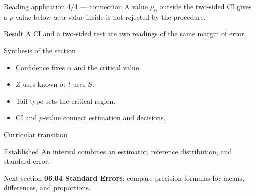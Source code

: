 \documentclass[10pt,aspectratio=169]{beamer}
\begin{document}
\begin{frame}{Reading application 4/4 --- connection}
  \footnotesize
  A value $\mu_0$ outside the two-sided CI gives a $p$-value below $\alpha$;
  a value inside is not rejected by the procedure.
  \begin{exampleblock}{Result}
    A CI and a two-sided test are two readings of the same margin of error.
  \end{exampleblock}
\end{frame}

\begin{frame}{Synthesis of the section}
  \footnotesize
  \begin{itemize}\itemsep=0.12cm
    \item Confidence fixes $\alpha$ and the critical value.
    \item $Z$ uses known $\sigma$; $t$ uses $S$.
    \item Tail type sets the critical region.
    \item CI and $p$-value connect estimation and decisions.
  \end{itemize}
\end{frame}

\begin{frame}{Curricular transition}
  \footnotesize
  \begin{block}{Established}
    An interval combines an estimator, reference distribution, and standard
    error.
  \end{block}
  \begin{alertblock}{Next section}
    \textbf{06.04 Standard Errors}: compare precision formulas for means,
    differences, and proportions.
  \end{alertblock}
\end{frame}
\end{document}
